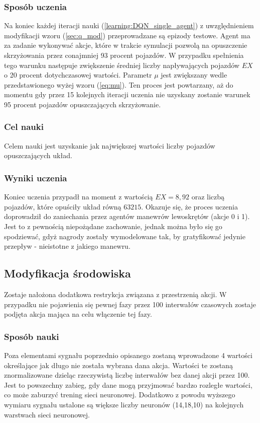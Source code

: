 \documentclass[12pt]{book}
\theoremstyle{plain}
\newcommand{\myref}[1]{(\ref{#1})}
\begin{document}
\subsubsection*{Sposób uczenia}
Na koniec każdej iteracji nauki \myref{learning:DQN_single_agent} z uwzględnieniem modyfikacji wzoru \myref{sec:q_mod} przeprowadzane są epizody testowe. Agent ma za zadanie wykonywać akcje, które w trakcie symulacji pozwolą na opuszczenie skrzyżowania przez conajmniej 93 procent pojazdów. W przypadku spełnienia tego warunku następuje zwiększenie średniej liczby napływających pojazdów $EX$ o 20 procent dotychczasowej wartości. Parametr $\mu$ jest zwiększany wedle przedstawionego wyżej wzoru \myref{eq:mu}. Ten proces jest powtarzany, aż do momentu gdy przez 15 kolejnych iteracji uczenia nie uzyskany zostanie warunek 95 procent pojazdów opuszczających skrzyżowanie.
\subsubsection*{Cel nauki}
Celem nauki jest uzyskanie jak największej wartości liczby pojazdów opuszczających układ.
\subsubsection*{Wyniki uczenia}
Koniec uczenia przypadł na moment z wartością $EX=8,92$ oraz liczbą pojazdów, które opuściły układ równą $63 215$. Okazuje się, że proces uczenia doprowadził do zaniechania przez agentów manewrów lewoskrętów (akcje 0 i 1). Jest to z pewnością niepożądane zachowanie, jednak można było się go spodziewać, gdyż nagrody zostały wymodelowane tak, by gratyfikować jedynie przepływ - nieistotne z jakiego manewru. 
\subsection{Modyfikacja środowiska}
Zostaje nałożona dodatkowa restrykcja związana z przestrzenią akcji. W przypadku nie pojawienia się pewnej fazy przez 100 interwałów czasowych zostaje podjęta akcja mająca na celu włączenie tej fazy.
\subsubsection*{Sposób nauki}
Poza elementami sygnału poprzednio opisanego zostaną wprowadzone 4 wartości określające jak długo nie została wybrana dana akcja. Wartości te zostaną znormalizowane dzieląc rzeczywistą liczbę interwałów bez danej akcji przez 100. Jest to powszechny zabieg, gdy dane mogą przyjmować bardzo rozległe wartości, co może zaburzyć trening sieci neuronowej. Dodatkowo z powodu wyższego wymiaru sygnału ustalone są większe liczby neuronów (14,18,10) na kolejnych warstwach sieci neuronowej.
\end{document}
